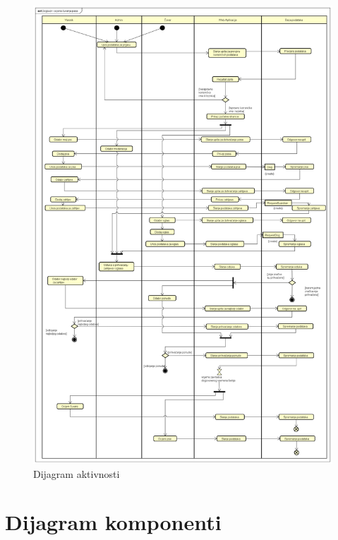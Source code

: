 			\begin{figure}[H]
				\centering
				\includegraphics[width=15cm]{slike/Dijagram aktivnosti}
				\caption{Dijagram aktivnosti}
				\label{fig:Activity-Diagram}
			\end{figure}
			
			 
			
			\eject
		\section{Dijagram komponenti}
		
		

